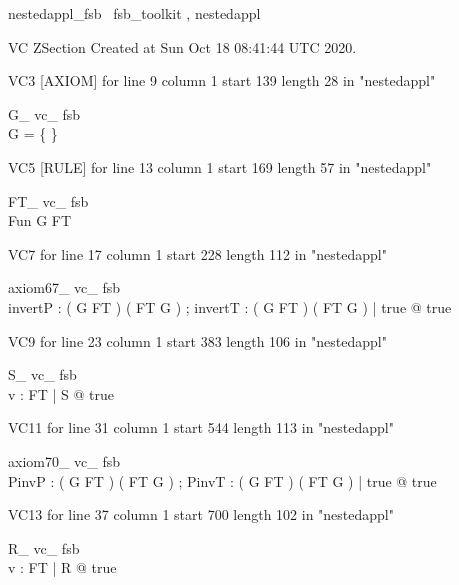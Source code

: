 \documentclass{article}
\begin{document}

\begin{zsection}	 \SECTION nestedappl\_fsb \parents~fsb\_toolkit , nestedappl
\end{zsection}

VC ZSection Created at Sun Oct 18 08:41:44 UTC 2020.

VC3 [AXIOM] for line 9 column 1 start 139 length 28 in "nestedappl"
\begin{theorem}{ G\_ vc\_ fsb}\\
 \lnot G = \{ \} \\

\end{theorem}

VC5 [RULE] for line 13 column 1 start 169 length 57 in "nestedappl"
\begin{theorem}{ FT\_ vc\_ fsb}\\
 Fun \in G \inj FT \\

\end{theorem}

VC7 for line 17 column 1 start 228 length 112 in "nestedappl"
\begin{theorem}{ axiom67\_ vc\_ fsb}\\
 \exists invertP : ( G \rel FT ) \pfun ( FT \rel G ) ; invertT : ( G \rel FT ) \fun ( FT \rel G ) | true @ true \\

\end{theorem}

VC9 for line 23 column 1 start 383 length 106 in "nestedappl"
\begin{theorem}{ S\_ vc\_ fsb}\\
 \exists v : FT | S @ true \\

\end{theorem}

VC11 for line 31 column 1 start 544 length 113 in "nestedappl"
\begin{theorem}{ axiom70\_ vc\_ fsb}\\
 \exists PinvP : ( G \pfun FT ) \pfun ( FT \pfun G ) ; PinvT : ( G \pfun FT ) \fun ( FT \pfun G ) | true @ true \\

\end{theorem}

VC13 for line 37 column 1 start 700 length 102 in "nestedappl"
\begin{theorem}{ R\_ vc\_ fsb}\\
 \exists v : FT | R @ true \\

\end{theorem}
\end{document}
